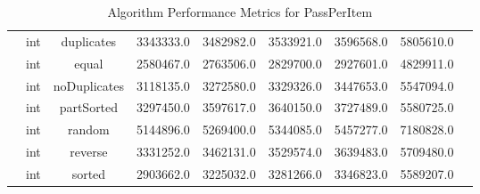 \documentclass{article}
\begin{document}
\begin{table}[H]
\begin{tabular}{|c|c|c|c|c|c|c|c|c|}
        & int & duplicates & 3343333.0 & 3482982.0 & 3533921.0 & 3596568.0 & 5805610.0 \\
        & int & equal & 2580467.0 & 2763506.0 & 2829700.0 & 2927601.0 & 4829911.0 \\
        & int & noDuplicates & 3118135.0 & 3272580.0 & 3329326.0 & 3447653.0 & 5547094.0 \\
        & int & partSorted & 3297450.0 & 3597617.0 & 3640150.0 & 3727489.0 & 5580725.0 \\
        & int & random & 5144896.0 & 5269400.0 & 5344085.0 & 5457277.0 & 7180828.0 \\
        & int & reverse & 3331252.0 & 3462131.0 & 3529574.0 & 3639483.0 & 5709480.0 \\
        & int & sorted & 2903662.0 & 3225032.0 & 3281266.0 & 3346823.0 & 5589207.0 \\
        \bottomrule
    \end{tabular}
    \caption{Algorithm Performance Metrics for PassPerItem}
\end{table}
\end{document}
